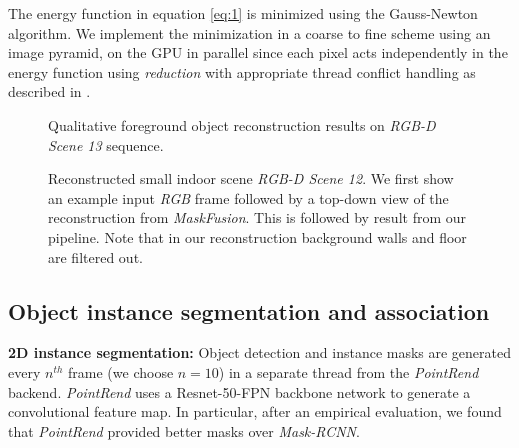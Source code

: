 The energy function in equation \ref{eq:1} is minimized using the Gauss-Newton algorithm. We implement the minimization in a coarse to fine scheme using an image pyramid, on the GPU in parallel since each pixel acts independently in the energy function using \textit{reduction} with appropriate thread conflict handling as described in \cite{dongGPUAcceleratedRobust2019}.


\begin{figure}[t!]
    \centering
    \caption{Qualitative foreground object reconstruction results on \emph{RGB-D Scene 13} sequence.}
    \vspace*{-1em}
    \label{fig:rgbd_scene13}
\end{figure}

\begin{figure}[t!]
    \centering
    \vspace{-2mm}
    \caption{Reconstructed small indoor scene \emph{RGB-D Scene 12}. We first show an example input \textit{RGB} frame followed by a top-down view of the reconstruction from \textit{MaskFusion}. This is followed by result from our pipeline. Note that in our reconstruction background walls and floor are filtered out. }
    \vspace*{-1em}
    \label{fig:rgbd_scene12}
\end{figure}


\subsection{Object instance segmentation and association} \label{subsec: segmentation}

\textbf{2D instance segmentation:} Object detection and instance masks are generated every $n^{th}$ frame (we choose $n=10$) in a separate thread from the \textit{PointRend} backend. \textit{PointRend} uses a Resnet-50-FPN backbone network to generate a convolutional feature map. In particular, after an empirical evaluation, we found that \textit{PointRend} provided better masks over \textit{Mask-RCNN}.

